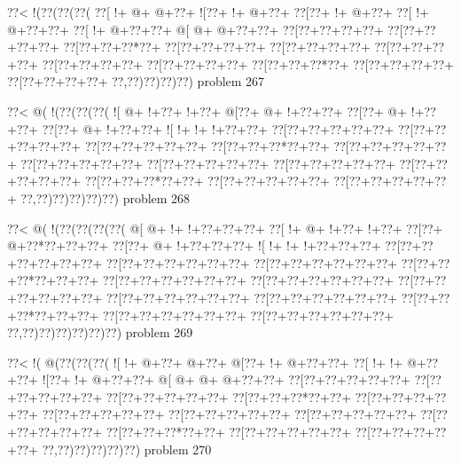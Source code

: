 \vbox{\vbox{\goo
\0??<\- !(\0??(\0??(\0??(
\0??[\- !+\- @+\- @+\0??+
\- ![\0??+\- !+\- @+\0??+
\0??[\0??+\- !+\- @+\0??+
\0??[\- !+\- @+\0??+\0??+
\0??[\- !+\- @+\0??+\0??+
\- @[\- @+\- @+\0??+\0??+
\0??[\0??+\0??+\0??+\0??+
\0??[\0??+\0??+\0??+\0??+
\0??[\0??+\0??+\0??*\0??+
\0??[\0??+\0??+\0??+\0??+
\0??[\0??+\0??+\0??+\0??+
\0??[\0??+\0??+\0??+\0??+
\0??[\0??+\0??+\0??+\0??+
\0??[\0??+\0??+\0??+\0??+
\0??[\0??+\0??+\0??*\0??+
\0??[\0??+\0??+\0??+\0??+
\0??[\0??+\0??+\0??+\0??+
\0??,\0??)\0??)\0??)\0??)
}
\hfil problem 267\hfil\break
}

\vbox{\vbox{\goo
\0??<\- @(\- !(\0??(\0??(\0??(
\- ![\- @+\- !+\0??+\- !+\0??+
\- @[\0??+\- @+\- !+\0??+\0??+
\0??[\0??+\- @+\- !+\0??+\0??+
\0??[\0??+\- @+\- !+\0??+\0??+
\- ![\- !+\- !+\- !+\0??+\0??+
\0??[\0??+\0??+\0??+\0??+\0??+
\0??[\0??+\0??+\0??+\0??+\0??+
\0??[\0??+\0??+\0??+\0??+\0??+
\0??[\0??+\0??+\0??*\0??+\0??+
\0??[\0??+\0??+\0??+\0??+\0??+
\0??[\0??+\0??+\0??+\0??+\0??+
\0??[\0??+\0??+\0??+\0??+\0??+
\0??[\0??+\0??+\0??+\0??+\0??+
\0??[\0??+\0??+\0??+\0??+\0??+
\0??[\0??+\0??+\0??*\0??+\0??+
\0??[\0??+\0??+\0??+\0??+\0??+
\0??[\0??+\0??+\0??+\0??+\0??+
\0??,\0??)\0??)\0??)\0??)\0??)
}
\hfil problem 268\hfil\break
}

\vbox{\vbox{\goo
\0??<\- @(\- !(\0??(\0??(\0??(\0??(
\- @[\- @+\- !+\- !+\0??+\0??+\0??+
\0??[\- !+\- @+\- !+\0??+\- !+\0??+
\0??[\0??+\- @+\0??*\0??+\0??+\0??+
\0??[\0??+\- @+\- !+\0??+\0??+\0??+
\- ![\- !+\- !+\- !+\0??+\0??+\0??+
\0??[\0??+\0??+\0??+\0??+\0??+\0??+
\0??[\0??+\0??+\0??+\0??+\0??+\0??+
\0??[\0??+\0??+\0??+\0??+\0??+\0??+
\0??[\0??+\0??+\0??*\0??+\0??+\0??+
\0??[\0??+\0??+\0??+\0??+\0??+\0??+
\0??[\0??+\0??+\0??+\0??+\0??+\0??+
\0??[\0??+\0??+\0??+\0??+\0??+\0??+
\0??[\0??+\0??+\0??+\0??+\0??+\0??+
\0??[\0??+\0??+\0??+\0??+\0??+\0??+
\0??[\0??+\0??+\0??*\0??+\0??+\0??+
\0??[\0??+\0??+\0??+\0??+\0??+\0??+
\0??[\0??+\0??+\0??+\0??+\0??+\0??+
\0??,\0??)\0??)\0??)\0??)\0??)\0??)
}
\hfil problem 269\hfil\break
}

\vbox{\vbox{\goo
\0??<\- !(\- @(\0??(\0??(\0??(
\- ![\- !+\- @+\0??+\- @+\0??+
\- @[\0??+\- !+\- @+\0??+\0??+
\0??[\- !+\- !+\- @+\0??+\0??+
\- ![\0??+\- !+\- @+\0??+\0??+
\- @[\- @+\- @+\- @+\0??+\0??+
\0??[\0??+\0??+\0??+\0??+\0??+
\0??[\0??+\0??+\0??+\0??+\0??+
\0??[\0??+\0??+\0??+\0??+\0??+
\0??[\0??+\0??+\0??*\0??+\0??+
\0??[\0??+\0??+\0??+\0??+\0??+
\0??[\0??+\0??+\0??+\0??+\0??+
\0??[\0??+\0??+\0??+\0??+\0??+
\0??[\0??+\0??+\0??+\0??+\0??+
\0??[\0??+\0??+\0??+\0??+\0??+
\0??[\0??+\0??+\0??*\0??+\0??+
\0??[\0??+\0??+\0??+\0??+\0??+
\0??[\0??+\0??+\0??+\0??+\0??+
\0??,\0??)\0??)\0??)\0??)\0??)
}
\hfil problem 270\hfil\break
}

